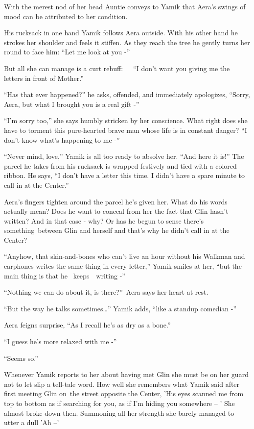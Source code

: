 \documentclass[twoside,11pt]{book}
\begin{document}
With the merest nod of her head Auntie conveys to Yamik that Aera's swings of mood can be attributed to her condition.

His rucksack in one hand Yamik follows Aera outside. With his other hand he strokes her shoulder and feels it stiffen.
As they reach the tree he gently turns her round to face him: ``Let me look at you -''

But all she can manage is a curt rebuff:\ \ \ ``I don't want you giving me the letters in front of
Mother.'' 

``Has that ever happened?'' he asks, offended, and immediately apologizes,
``Sorry, Aera, but what I brought you is a real gift -'' 

``I'm sorry too,'' she says humbly stricken by her conscience. What right does she have to
torment this pure-hearted brave man whose life is in constant danger? ``I don't know what's happening to
me -''

``Never mind, love,'' Yamik is all too ready to absolve her. ``And here it
is!'' The parcel he takes from his rucksack is wrapped festively and tied with a colored ribbon. He says,
``I don't have a letter this time. I didn't have a spare minute to call in at the Center.'' 

Aera's fingers tighten around the parcel he's given her. What do his words actually mean? Does he want to conceal from
her the fact that Glin hasn't written? And in that case - why? Or has he begun to sense there's something\ between Glin
and herself and that's why he didn't call in at the Center?

``Anyhow, that skin-and-bones who can't live an hour without his Walkman and earphones writes the same
thing in every letter,'' Yamik smiles at her, ``but the main thing is that he
\ keeps\ \ writing -'' 

``Nothing we can do about it, is there?''~Aera says her heart at rest.

``But the way he talks sometimes{\dots}'' Yamik adds, ``like a standup comedian
-'' 

Aera feigns surprise, ``As I recall he's as dry as a bone.''

``I guess he's more relaxed with me -'' 

``Seems so.'' 

 Whenever Yamik reports to her about having met Glin she must be on her guard not to let slip a tell-tale word. How well
she remembers what Yamik said after first meeting Glin on~the street opposite the Center, 'His eyes scanned me from top
to bottom as if searching for you, as if I'm hiding you somewhere -- ' She almost broke down then. Summoning all her
strength she barely managed to utter a dull 'Ah --' 
\end{document}
